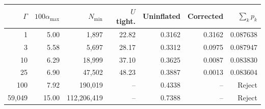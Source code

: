 \begin{tabular}{rrrrrrr}
\toprule
$\Gamma$ & $100\alpha_{\max}$ & $N_{\min}$ & $U$ tight. & Uninflated & Corrected & $\sum_k p_k$ \\
\midrule
1 & 5.00 & 1,897 & 22.82 & 0.3162 & 0.3162 & 0.087638 \\
3 & 5.58 & 5,697 & 28.17 & 0.3312 & 0.0975 & 0.087947 \\
10 & 6.29 & 18,999 & 37.10 & 0.3625 & 0.0087 & 0.083830 \\
25 & 6.90 & 47,502 & 48.23 & 0.3887 & 0.0013 & 0.083604 \\
100 & 7.92 & 190,019 & -- & 0.4338 & -- & Reject \\
59,049 & 15.00 & 112,206,419 & -- & 0.7388 & -- & Reject \\
\bottomrule
\end{tabular}
